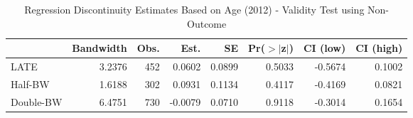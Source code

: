 \begin{table}[ht]
\centering
\begin{tabular}{lrrrrrrr}
  \hline
 & Bandwidth & Obs. & Est. & SE & Pr($>$$|$z$|$) & CI (low) & CI (high) \\ 
  \hline
LATE & 3.2376 & 452 & 0.0602 & 0.0899 & 0.5033 & -0.5674 & 0.1002 \\ 
  Half-BW & 1.6188 & 302 & 0.0931 & 0.1134 & 0.4117 & -0.4169 & 0.0821 \\ 
  Double-BW & 6.4751 & 730 & -0.0079 & 0.0710 & 0.9118 & -0.3014 & 0.1654 \\ 
   \hline
\end{tabular}
\caption{Regression Discontinuity Estimates Based on Age (2012) - Validity Test using Non-Outcome} 
\label{tab:rd2012y_non}
\end{table}
